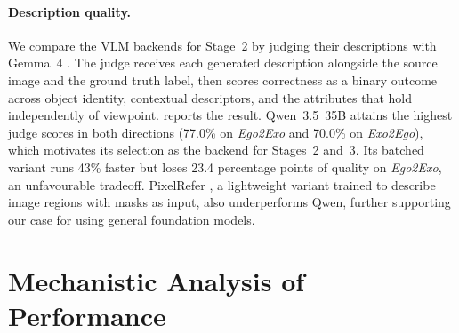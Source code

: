 \paragraph{Description quality.}
We compare the VLM backends for Stage~2 by judging their descriptions with Gemma~4 \cite{gemma4blog}. The judge receives each generated description alongside the source image and the ground truth label, then scores correctness as a binary outcome across object identity, contextual descriptors, and the attributes that hold independently of viewpoint.  reports the result. Qwen~3.5~35B attains the highest judge scores in both directions (77.0\% on \textit{Ego2Exo} and 70.0\% on \textit{Exo2Ego}), which motivates its selection as the backend for Stages~2 and~3. Its batched variant runs 43\% faster but loses 23.4 percentage points of quality on \textit{Ego2Exo}, an unfavourable tradeoff. PixelRefer \cite{yuan2025pixelreferunifiedframeworkspatiotemporal}, a lightweight variant trained to describe image regions with masks as input, also underperforms Qwen, further supporting our case for using general foundation models.


\section{Mechanistic Analysis of Performance}
\label{sec:gap-analysis}

